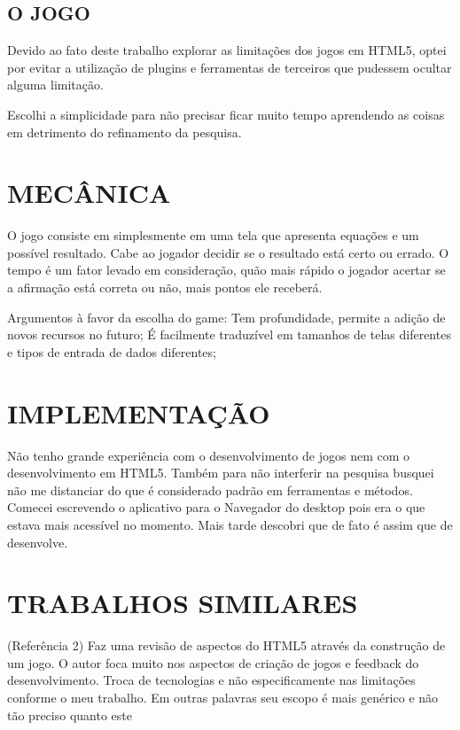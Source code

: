 \documentclass[11pt,a4paper]{article}
\begin{document}
\subsection{O JOGO}

Devido ao fato deste trabalho explorar as limitações dos jogos em
HTML5, optei por evitar a utilização de plugins e ferramentas de
terceiros que pudessem ocultar alguma limitação.

Escolhi a simplicidade para não precisar ficar muito tempo aprendendo
as coisas em detrimento do refinamento da pesquisa.

\section{MECÂNICA}

O jogo consiste em simplesmente em uma tela que apresenta equações e
um possível resultado. Cabe ao jogador decidir se o resultado está
certo ou errado. O tempo é um fator levado em consideração, quão
mais rápido o jogador acertar se a afirmação está correta ou não,
mais pontos ele receberá.

Argumentos à favor da escolha do game: Tem profundidade, permite a
adição de novos recursos no futuro;
É facilmente traduzível em tamanhos de telas diferentes e tipos de
entrada de dados diferentes;

\section{IMPLEMENTAÇÃO}

Não tenho grande experiência com o desenvolvimento de jogos nem com
o desenvolvimento em HTML5. Também para não interferir na pesquisa
busquei não me distanciar do que é considerado padrão em ferramentas
e métodos.
Comecei escrevendo o aplicativo para o Navegador do desktop pois era o
que estava mais acessível no momento. Mais tarde descobri que de fato
é assim que de desenvolve.

\section{ TRABALHOS SIMILARES}

(Referência 2) Faz uma revisão de aspectos do HTML5 através da
construção de um jogo. O autor foca muito nos aspectos de criação
de jogos e feedback do desenvolvimento. Troca de tecnologias e não
especificamente nas limitações conforme o meu trabalho. Em outras
palavras seu escopo é mais genérico e não tão preciso quanto este
\end{document}

